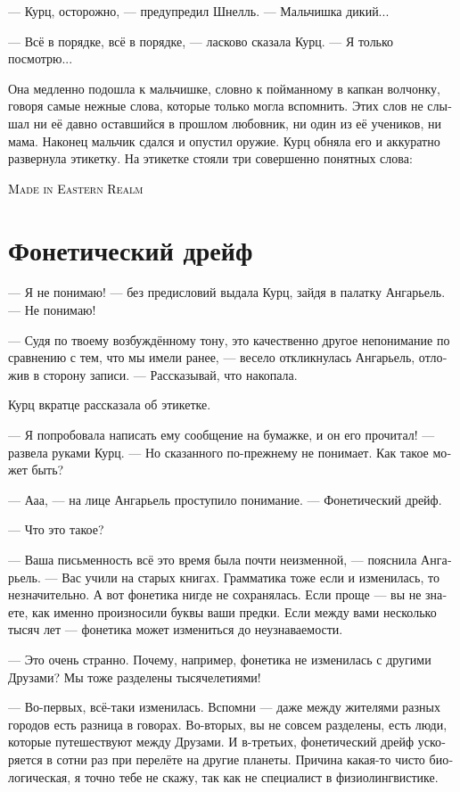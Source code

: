 \documentclass[a4paper,12pt,fleqn]{book}\usepackage{cooltooltips}\usepackage{polyglossia}\setdefaultlanguage[babelshorthands=true]{russian}\setotherlanguage{english}\defaultfontfeatures{Ligatures=TeX,Mapping=tex-text} \usepackage{xcolor}\definecolor{lightgray}{HTML}{bbbbbb}\color{lightgray}\newcommand{\ml}[3]{\textenglish{\textcolor{black}{#3}}}
\begin{document}
--- Курц, осторожно, --- предупредил Шнелль.
--- Мальчишка дикий...

--- Всё в порядке, всё в порядке, --- ласково сказала Курц.
--- Я только посмотрю...

Она медленно подошла к мальчишке, словно к пойманному в капкан волчонку, говоря самые нежные слова, которые только могла вспомнить.
Этих слов не слышал ни её давно оставшийся в прошлом любовник, ни один из её учеников, ни мама.
Наконец мальчик сдался и опустил оружие.
Курц обняла его и аккуратно развернула этикетку.
На этикетке стояли три совершенно понятных слова:

\ml{$0$}
{<<Сделано в Восточной Стране>>}
{\textsc{Made in Eastern Realm}}

\section{Фонетический дрейф}

--- Я не понимаю! --- без предисловий выдала Курц, зайдя в палатку Ангарьель.
--- Не понимаю!

--- Судя по твоему возбуждённому тону, это качественно другое непонимание по сравнению с тем, что мы имели ранее, --- весело откликнулась Ангарьель, отложив в сторону записи.
--- Рассказывай, что накопала.

Курц вкратце рассказала об этикетке.

--- Я попробовала написать ему сообщение на бумажке, и он его прочитал! --- развела руками Курц.
--- Но сказанного по-прежнему не понимает.
Как такое может быть?

--- Ааа, --- на лице Ангарьель проступило понимание.
--- Фонетический дрейф.

--- Что это такое?

--- Ваша письменность всё это время была почти неизменной, --- пояснила Ангарьель.
--- Вас учили на старых книгах.
Грамматика тоже если и изменилась, то незначительно.
А вот фонетика нигде не сохранялась.
Если проще --- вы не знаете, как именно произносили буквы ваши предки.
Если между вами несколько тысяч лет --- фонетика может измениться до неузнаваемости.

--- Это очень странно.
Почему, например, фонетика не изменилась с другими Друзами?
Мы тоже разделены тысячелетиями!

--- Во-первых, всё-таки изменилась.
Вспомни --- даже между жителями разных городов есть разница в говорах.
Во-вторых, вы не совсем разделены, есть люди, которые путешествуют между Друзами.
И в-третьих, фонетический дрейф ускоряется в сотни раз при перелёте на другие планеты.
Причина какая-то чисто биологическая, я точно тебе не скажу, так как не специалист в физиолингвистике.
\end{document}
